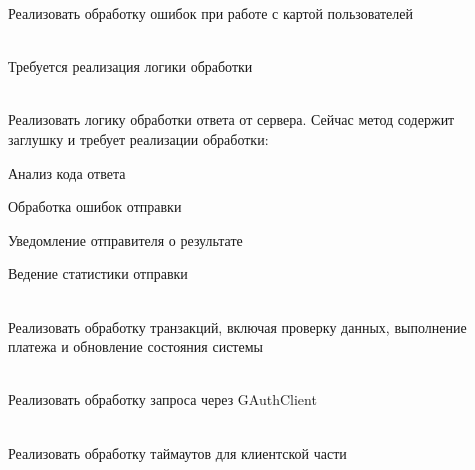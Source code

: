 \begin{DoxyRefList}
\label{todo__todo000037}%
%
Реализовать обработку ошибок при работе с картой пользователей  
\item[Member \doxylink{class_g_n_e_t_1_1_sys_send_mail3___re_ac8efa0a3f269852ac072bef063dbfc81}{GNET\+::Sys\+Send\+Mail3\+\_\+\+Re\+::Process} (Manager \texorpdfstring{$\ast$}{*}manager, Manager\+::\+Session\+::\+ID sid)]\hfill \\
\label{todo__todo000038}%
%
Требуется реализация логики обработки  
\item[Member \doxylink{class_g_n_e_t_1_1_sys_send_mail___re_aee9b57bf0d0707a080303a041e0dab0d}{GNET\+::Sys\+Send\+Mail\+\_\+\+Re\+::Process} (Manager \texorpdfstring{$\ast$}{*}manager, Manager\+::\+Session\+::\+ID sid)]\hfill \\
\label{todo__todo000039}%
%
Реализовать логику обработки ответа от сервера. Сейчас метод содержит заглушку и требует реализации обработки\+:
\begin{DoxyItemize}
\item Анализ кода ответа
\item Обработка ошибок отправки
\item Уведомление отправителя о результате
\item Ведение статистики отправки 
\end{DoxyItemize}
\item[Member \doxylink{class_g_n_e_t_1_1_trans_buy_point_aad328b963d528b2d8a695e3793c73529}{GNET\+::Trans\+Buy\+Point\+::Process} (Manager \texorpdfstring{$\ast$}{*}manager, Manager\+::\+Session\+::\+ID sid)]\hfill \\
\label{todo__todo000040}%
%
Реализовать обработку транзакций, включая проверку данных, выполнение платежа и обновление состояния системы  
\item[Member \doxylink{class_g_n_e_t_1_1_user_login2_a7d61288662e68a7168dbb4d026483086}{GNET\+::User\+Login2\+::Delivery} (Manager\+::\+Session\+::\+ID proxy\+\_\+sid, const Octets\+Stream \&os\+Arg)]\hfill \\
\label{todo__todo000042}%
%
Реализовать обработку запроса через GAuth\+Client  
\item[Member \doxylink{class_g_n_e_t_1_1_user_login2_a7d87dc03996960a49065f50388d624ef}{GNET\+::User\+Login2\+::On\+Timeout} ()]\hfill \\
\label{todo__todo000044}%
%
Реализовать обработку таймаутов для клиентской части  

\end{DoxyRefList}
